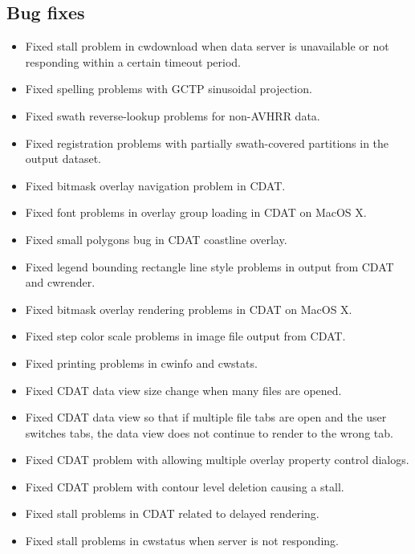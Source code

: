 \subsection*{Bug fixes}
\begin{itemize}

  \item Fixed stall problem in cwdownload when data server is
  unavailable or not responding within a certain timeout period.

  \item Fixed spelling problems with GCTP sinusoidal projection.

  \item Fixed swath reverse-lookup problems for non-AVHRR data.

  \item Fixed registration problems with partially swath-covered
  partitions in the output dataset.

  \item Fixed bitmask overlay navigation problem in CDAT.

  \item Fixed font problems in overlay group loading in CDAT on MacOS
  X.

  \item Fixed small polygons bug in CDAT coastline overlay.

  \item Fixed legend bounding rectangle line style problems in output
  from CDAT and cwrender.

  \item Fixed bitmask overlay rendering problems in CDAT on MacOS X.

  \item Fixed step color scale problems in image file output from
  CDAT.

  \item Fixed printing problems in cwinfo and cwstats.

  \item Fixed CDAT data view size change when many files are opened.

  \item Fixed CDAT data view so that if multiple file tabs are open
  and the user switches tabs, the data view does not continue to
  render to the wrong tab.

  \item Fixed CDAT problem with allowing multiple overlay property
  control dialogs.

  \item Fixed CDAT problem with contour level deletion causing a
  stall.

  \item Fixed stall problems in CDAT related to delayed rendering.

  \item Fixed stall problems in cwstatus when server is not
  responding.

\end{itemize}

